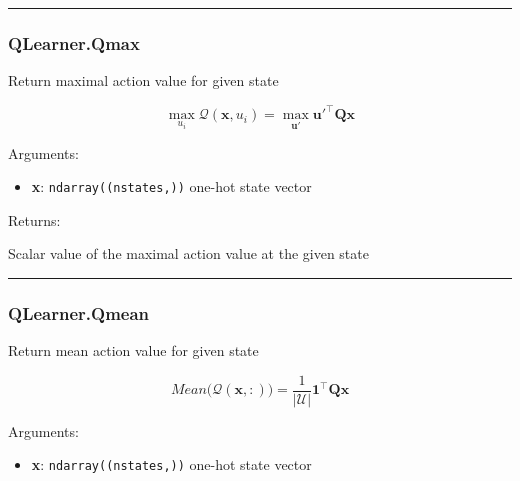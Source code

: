 \begin{center}\rule{0.5\linewidth}{\linethickness}\end{center}

\subsubsection{QLearner.Qmax}\label{qlearner.qmax}

\begin{Shaded}
\begin{Highlighting}[]
\end{Highlighting}
\end{Shaded}

Return maximal action value for given state

\[
\max_{u_i}\mathcal Q(\mathbf x, u_i) = \max_{\mathbf u'} \mathbf u'^\top \mathbf Q \mathbf x
\]

Arguments:

\begin{itemize}
\tightlist
\item
  \textbf{x}: \texttt{ndarray((nstates,))} one-hot state vector
\end{itemize}

Returns:

Scalar value of the maximal action value at the given state

\begin{center}\rule{0.5\linewidth}{\linethickness}\end{center}

\subsubsection{QLearner.Qmean}\label{qlearner.qmean}

\begin{Shaded}
\begin{Highlighting}[]
\end{Highlighting}
\end{Shaded}

Return mean action value for given state

\[
Mean \big(\mathcal Q(\mathbf x, :)\big) = \frac{1}{|\mathcal U|} \mathbf 1^\top \mathbf Q \mathbf x
\]

Arguments:

\begin{itemize}
\tightlist
\item
  \textbf{x}: \texttt{ndarray((nstates,))} one-hot state vector
\end{itemize}

